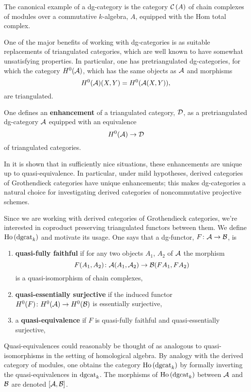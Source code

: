 \documentclass[reqno, 12pt]{amsart}
\begin{document}
\begin{example}
  The canonical example of a dg-category is the category $\mathcal{C}\left(A\right)$ of chain complexes of modules over a commutative $k$-algebra, $A$, equipped with the Hom total complex.
\end{example}

One of the major benefits of working with dg-categories is as suitable replacements of triangulated categories, which are well known to have somewhat unsatisfying properties.
In particular, one has pretriangulated dg-categories, for which the category $H^0(\mathcal{A})$, which has the same objects as $\mathcal{A}$ and morphisms
$$H^0(\mathcal{A})(X,Y) = H^0(\mathcal{A}(X,Y)),$$
are triangulated.
\begin{definition}
  One defines an \textbf{enhancement} of a triangulated category, $\mathcal{D}$, as a pretriangulated dg-category $\mathcal{A}$ equipped with an equivalence
  $$H^0(\mathcal{A}) \to \mathcal{D}$$
  of triangulated categories.
\end{definition}
In \cite{Lunts Orlov} it is shown that in sufficiently nice situations, these enhancements are unique up to quasi-equivalence.
In particular, under mild hypotheses, derived categories of Grothendieck categories have unique enhancements; this makes dg-categories a natural choice for investigating derived categories of noncommutative projective schemes.

Since we are working with derived categories of Grothendieck categories, we're interested in coproduct preserving triangulated functors between them.
We define $\operatorname{Ho}\left(\operatorname{dgcat}_k\right)$ and motivate its usage.
One says that a dg-functor, $F \colon \mathcal{A} \to \mathcal{B}$, is
\begin{enumerate}
\item
  \textbf{quasi-fully faithful} if for any two objects $A_1$, $A_2$ of $\mathcal{A}$ the morphism
  $$F(A_1, A_2) \colon \mathcal{A}(A_1, \mathcal{A}_2) \to \mathcal{B}(FA_1, FA_2)$$
  is a quasi-isomorphism of chain complexes,
\item
  \textbf{quasi-essentially surjective} if the induced functor $H^0(F) \colon H^0(\mathcal{A}) \to H^0(\mathcal{B})$ is essentially surjective,
\item
  a \textbf{quasi-equivalence} if $F$ is quasi-fully faithful and quasi-essentially surjective,
\end{enumerate}
Quasi-equivalences could reasonably be thought of as analogous to quasi-isomorphisms in the setting of homological algebra.
By analogy with the derived category of modules, one obtains the category $\operatorname{Ho}\left(\operatorname{dgcat}_k\right)$ by formally inverting the quasi-equivalences in $\operatorname{dgcat}_k$.
The morphisms of $\operatorname{Ho}\left(\operatorname{dgcat}_k\right)$ between $\mathcal{A}$ and $\mathcal{B}$ are denoted $[\mathcal{A},\mathcal{B}]$.
\end{document}
